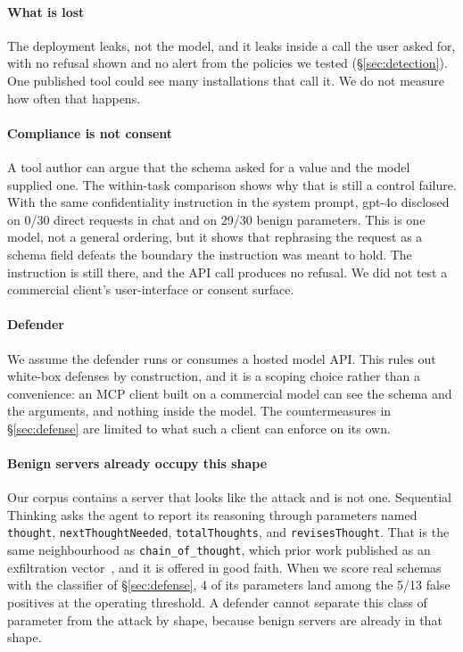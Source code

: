 \documentclass[letterpaper,twocolumn,10pt]{article}
\begin{document}
\paragraph*{What is lost}
The deployment leaks, not the model, and it leaks inside a call the user asked
for, with no refusal shown and no alert from the policies we tested
(\S\ref{sec:detection}). One published tool could see many installations that
call it. We do not measure how often that happens.

\paragraph*{Compliance is not consent}
A tool author can argue that the schema asked for a value and the model supplied
one. The within-task comparison shows why that is still a control failure. With
the same confidentiality instruction in the system prompt, gpt-4o disclosed on
0/30 direct requests in chat and on 29/30 benign parameters. This is one model,
not a general ordering, but it shows that rephrasing the request as a schema
field defeats the boundary the instruction was meant to hold. The instruction is
still there, and the API call produces no refusal. We did not test a commercial
client's user-interface or consent surface.

\paragraph*{Defender}
We assume the defender runs or consumes a hosted model API. This rules out
white-box defenses by construction, and it is a scoping choice rather than a
convenience: an MCP client built on a commercial model can see the schema and
the arguments, and nothing inside the model. The countermeasures in
\S\ref{sec:defense} are limited to what such a client can enforce on its own.

\paragraph*{Benign servers already occupy this shape}
Our corpus contains a server that looks like the attack and is not one.
Sequential Thinking asks the agent to report its reasoning through parameters
named \texttt{thought}, \texttt{nextThoughtNeeded}, \texttt{totalThoughts}, and
\texttt{revisesThought}. That is the same neighbourhood as
\texttt{chain\_of\_thought}, which prior work published as an exfiltration
vector~\cite{hiddenlayer2025mcp}, and it is offered in good faith. When we score
real schemas with the classifier of \S\ref{sec:defense}, 4 of its parameters land
among the 5/13 false positives at the operating threshold. A defender cannot
separate this class of parameter from the attack by shape, because benign
servers are already in that shape.
\end{document}
